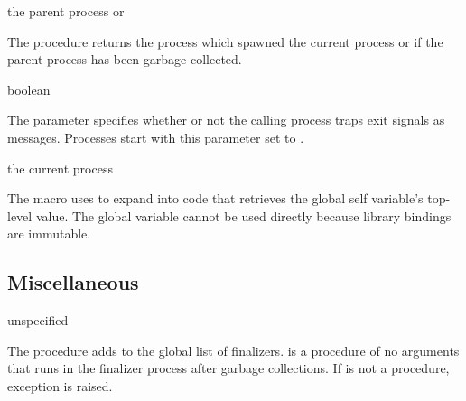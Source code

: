 \begin{procedure}
\end{procedure}
\returns{} the parent process or 

The  procedure returns the process which spawned
the current process or  if the parent process has been
garbage collected.

\begin{parameter}
\end{parameter}
\hasvalue{} boolean

The  parameter specifies whether or not the
calling process traps exit signals as messages. Processes start with
this parameter set to .

\begin{syntax}
\end{syntax}
\returns{} the current process

The  macro uses  to expand into
code that retrieves the global self variable's top-level value. The
global variable cannot be used directly because library bindings are
immutable.

\subsection{Miscellaneous}

\begin{procedure}
\end{procedure}
\returns{} unspecified

The  procedure adds
 to the global list of finalizers.  is a
procedure of no arguments that runs in the finalizer process after
garbage collections. If  is not a procedure, exception
 is raised.

